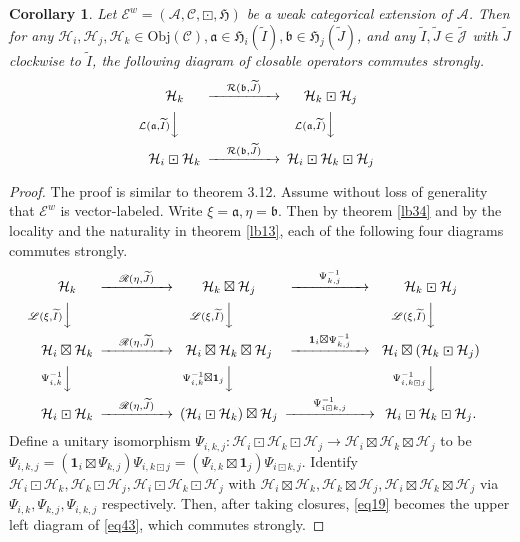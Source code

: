 \documentclass[11pt,b5paper,notitlepage]{article}
\theoremstyle{definition}
\theoremstyle{plain}
\newtheorem{co}[df]{Corollary}
\newcommand{\fk}{\mathfrak}
\newcommand{\mc}{\mathcal}
\newcommand{\wtd}{\widetilde}
\newcommand{\id}{\mathbf{1}}
\newcommand{\scr}{\mathscr}
\newcommand{\Jtd}{\widetilde{\mathcal J}}
\newcommand{\Obj}{\mathrm{Obj}}
\numberwithin{equation}{subsection}
\begin{document}
\begin{co}\label{lb35}
Let $\scr E^w=(\mc A,\scr C,\boxdot,\fk H)$ be a  weak categorical extension of $\mc A$. Then for any $\mc H_i,\mc H_j,\mc H_k\in\Obj(\scr C),\fk a\in\fk H_i(\wtd I),\fk b\in\fk H_j(\wtd J)$, and any $\wtd I,\wtd J\in\Jtd$ with $\wtd J$ clockwise to $\wtd I$, the following diagram of closable operators commutes strongly.
\begin{align}
\begin{CD}
\mc H_k @> \quad \mc R(\fk b,\wtd J)\quad   >> \mc H_k\boxdot\mc H_j\\
@V \mc L(\fk a,\wtd I)   V  V @V \mc L(\fk a,\wtd I) VV\\
\mc H_i\boxdot\mc H_k @> \quad \mc R(\fk b,\wtd J) \quad  >> \mc H_i\boxdot\mc H_k\boxdot\mc H_j
\end{CD}\label{eq19}
\end{align}
\end{co}


\begin{proof}
The proof is similar to \cite{Gui21a} theorem 3.12. Assume without loss of generality that $\scr E^w$ is vector-labeled. Write $\xi=\fk a,\eta=\fk b$. Then by theorem \ref{lb34} and by the locality and the naturality in theorem \ref{lb13}, each of the following four diagrams commutes strongly.
\begin{align}
\begin{CD}
\mc H_k @> \quad \scr R(\eta,\wtd J)\quad   >> \mc H_k\boxtimes\mc H_j  @> ~~\quad\Psi^{-1}_{k,j}\quad~~ >> \mc H_k\boxdot\mc H_j \\
@V \scr L(\xi,\wtd I)   V  V @V \scr L(\xi,\wtd I) VV   @V  \scr L(\xi,\wtd I) VV\\
\mc H_i\boxtimes\mc H_k @> \quad \scr R(\eta,\wtd J) \quad  >> \mc H_i\boxtimes\mc H_k\boxtimes\mc H_j  @> \quad\id_i\boxtimes\Psi^{-1}_{k,j}\quad >>\mc H_i\boxtimes(\mc H_k\boxdot\mc H_j)\\
@ V \Psi^{-1}_{i,k} VV  @V \Psi^{-1}_{i,k}\boxtimes\id_j VV  @V \Psi^{-1}_{i,k\boxdot j}VV\\
\mc H_i\boxdot\mc H_k  @> \quad \scr R(\eta,\wtd J)\quad >> (\mc H_i\boxdot \mc H_k)\boxtimes\mc H_j  @> ~~\quad\Psi^{-1}_{i\boxdot k,j}\quad~~ >> \mc H_i\boxdot\mc H_k\boxdot\mc H_j.
\end{CD}\label{eq43}
\end{align}
Define a unitary isomorphism $\Psi_{i,k,j}:\mc H_i\boxdot\mc H_k\boxdot\mc H_j\rightarrow \mc H_i\boxtimes\mc H_k\boxtimes\mc H_j$ to be $\Psi_{i,k,j}=(\id_i\boxtimes\Psi_{k,j})\Psi_{i,k\boxdot j}=(\Psi_{i,k}\boxtimes\id_j)\Psi_{i\boxdot k,j}$. Identify $\mc H_i\boxdot\mc H_k,\mc H_k\boxdot\mc H_j,\mc H_i\boxdot\mc H_k\boxdot\mc H_j$ with $\mc H_i\boxtimes\mc H_k,\mc H_k\boxtimes\mc H_j,\mc H_i\boxtimes\mc H_k\boxtimes\mc H_j$ via $\Psi_{i,k},\Psi_{k,j},\Psi_{i,k,j}$ respectively. Then, after taking closures, \eqref{eq19} becomes the upper left diagram of \eqref{eq43}, which commutes strongly.
\end{proof}
\end{document}
